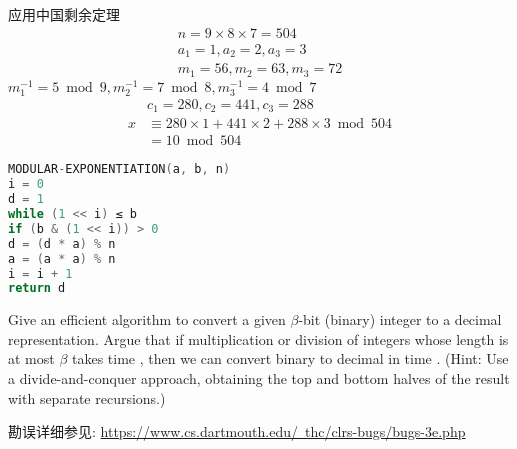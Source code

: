 \documentclass[a4paper, justified]{tufte-handout}
\begin{document}
\begin{problem}[TC 31.5-2]
\end{problem}

\begin{solution}
	应用中国剩余定理
	$$
		\begin{gathered}
			n=9 \times 8 \times 7=504 \\
			a_1=1, a_2=2, a_3=3 \\
			m_1=56, m_2=63, m_3=72
		\end{gathered}
	$$
	$m_1^{-1}=5 \bmod 9, m_2^{-1}=7 \bmod 8, m_3^{-1}=4 \bmod 7$
	$$
		\begin{aligned}
			  & c_1=280, c_2=441, c_3=288                               \\
			x & \equiv 280 \times 1+441 \times 2+288 \times 3 \bmod 504 \\
			  & =10 \bmod 504
		\end{aligned}
	$$
\end{solution}

\begin{problem}[TC 31.6-2]
\end{problem}

\begin{solution}
	\begin{lstlisting}[language=C++,style=style1]
MODULAR-EXPONENTIATION(a, b, n)
i = 0
d = 1
while (1 << i) ≤ b
if (b & (1 << i)) > 0
d = (d * a) % n
a = (a * a) % n
i = i + 1
return d
\end{lstlisting}
\end{solution}

\begin{problem}[TC 31.1-13(有勘误)]
Give an efficient algorithm to convert a given $\beta$-bit (binary) integer to a decimal representation.
Argue that if multiplication or division of integers whose length is at most $\beta$ takes time ,
then we can convert binary to decimal in time . (Hint: Use a divide-and-conquer approach, obtaining the top and
bottom halves of the result with separate recursions.)

勘误详细参见: \href{https://www.cs.dartmouth.edu/~thc/clrs-bugs/bugs-3e.php}{https://www.cs.dartmouth.edu/~thc/clrs-bugs/bugs-3e.php}
\end{problem}
\end{document}
